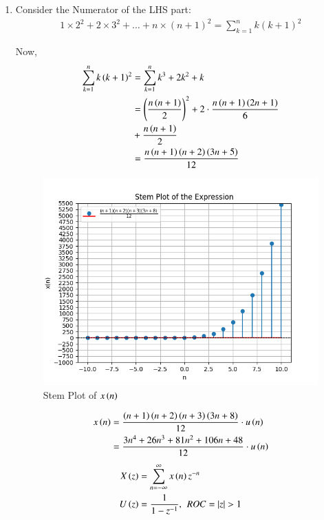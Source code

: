 \documentclass[journal,12pt,twocolumn]{IEEEtran}
\theoremstyle{remark}
\begin{document}
\begin{enumerate}[label=\arabic*.]
\item Consider the Numerator of the LHS part:
\begin{align}
    1\times2^2 + 2\times3^2 + \dots + n\times(n+1)^2 = \sum_{k=1}^n k(k+1)^2 
\end{align}

Now,
\begin{align}
    \sum_{k=1}^n k\left(k+1\right)^2 &= \sum_{k=1}^n k^3+2k^2+k\\
                          &= \left(\frac{n\left(n+1\right)}{2}\right)^{\scriptstyle 2} + 2\cdot \frac{n\left(n+1\right)\left(2n+1\right)}{6}\\ &+\frac{n\left(n+1\right)}{2}\notag \\
                          &= \frac{n\left(n+1\right)\left(n+2\right)\left(3n+5\right)}{12}
\end{align}
\begin{figure}[h]
    \hspace{1cm}
    \includegraphics[width=1\columnwidth]{Figure_1.png}
    \caption{Stem Plot of $x\left(n\right)$}
\end{figure}
\begin{align}
    x\left(n\right) &=  \frac{\left(n+1\right)\left(n+2\right)\left(n+3\right)\left(3n+8\right)}{12}\cdot u\left(n\right)\\
         &= \frac{3n^4 + 26n^3 + 81n^2 + 106n + 48}{12}\cdot u\left(n\right) \label{eq:11.9.5.26.1}
\end{align}
    \begin{align}
    X\brak{z} &= \sum_{n=-\infty}^\infty x\brak{n}z^{-n} \\
     U\brak{z} &= \frac{1}{1 - z^{-1}} , \hspace{4pt}ROC=|z|>1

\end{align}
\end{enumerate}
\end{document}
